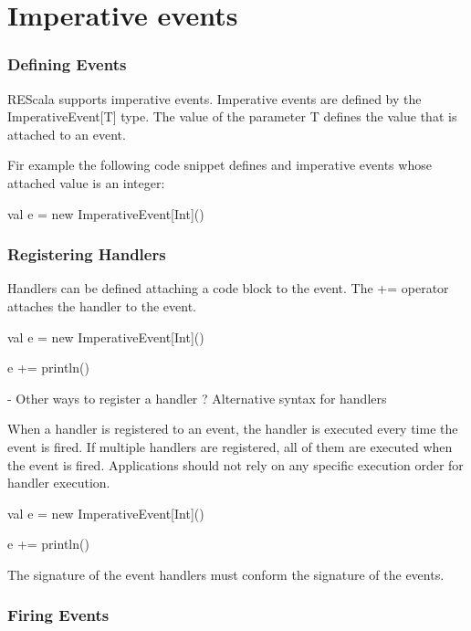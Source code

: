 \documentclass[10pt,a4paper]{article}
\newcommand{\code}[1]{{\fontfamily{cmtt}\small\selectfont#1}}
\begin{document}
\section{Imperative events}

\subsubsection{Defining  Events}

REScala supports imperative events. Imperative events are defined by
the \code{ImperativeEvent[T]} type. The value of the parameter
\code{T} defines the value that is attached to an event.

Fir example the following code snippet defines and imperative events
whose attached value is an integer:
\begin{codenv}
val e = new ImperativeEvent[Int]()
\end{codenv}

\subsubsection{Registering Handlers}

Handlers can be defined attaching a code block to the event. The
\code{+=} operator attaches the handler to the event.

\begin{codenv}
val e = new ImperativeEvent[Int]()

e += { println() }
\end{codenv}

- Other ways to register a handler ? Alternative syntax for handlers


When a handler is registered to an event, the handler is executed
every time the event is fired. If multiple handlers are registered,
all of them are executed when the event is fired. Applications should
not rely on any specific execution order for handler execution.

\begin{codenv}
val e = new ImperativeEvent[Int]()

e += { println() }
\end{codenv}


The signature of the event handlers must conform the signature of the
events.





\subsubsection{Firing Events}
\end{document}
